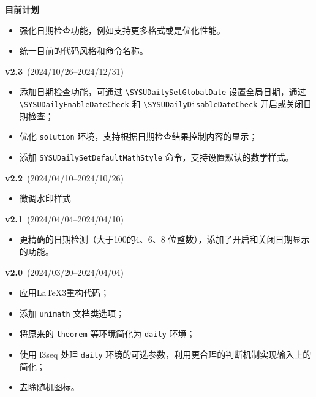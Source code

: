 \documentclass{SYSUDaily}
\begin{document}
\begin{flushleft}
	\footnotesize
	\textbf{目前计划}
	\begin{itemize}
		\item 强化日期检查功能，例如支持更多格式或是优化性能。
		\item 统一目前的代码风格和命令名称。
	\end{itemize}

	\textbf{v2.3}~(2024/10/26--2024/12/31)
	\begin{itemize}
		\item 添加日期检查功能，可通过 \verb|\SYSUDailySetGlobalDate| 设置全局日期，通过 \verb|\SYSUDailyEnableDateCheck| 和 \verb|\SYSUDailyDisableDateCheck| 开启或关闭日期检查；
		\item 优化 \verb|solution| 环境，支持根据日期检查结果控制内容的显示；
		\item 添加 \verb|SYSUDailySetDefaultMathStyle| 命令，支持设置默认的数学样式。
	\end{itemize}

	\textbf{v2.2}~(2024/04/10--2024/10/26)
	\begin{itemize}
		\item 微调水印样式
	\end{itemize}

	\textbf{v2.1}~(2024/04/04--2024/04/10)
	\begin{itemize}[parsep=0pt,itemsep=0pt]
		\item
		      更精确的日期检测（大于100的4、6、8 位整数），添加了开启和关闭日期显示的功能。
	\end{itemize}

	\textbf{v2.0}~(2024/03/20--2024/04/04)
	\begin{itemize}[parsep=0pt,itemsep=0pt]
		\item
		      应用\LaTeX{3}重构代码；
		\item
		      添加 \verb|unimath| 文档类选项；
		\item
		      将原来的 \verb|theorem| 等环境简化为 \verb|daily| 环境；
		\item
		      使用 \textsf{l3seq} 处理 \verb|daily| 环境的可选参数，利用更合理的判断机制实现输入上的简化；
		\item
		      去除随机图标。
	\end{itemize}
\end{flushleft}
\end{document}
